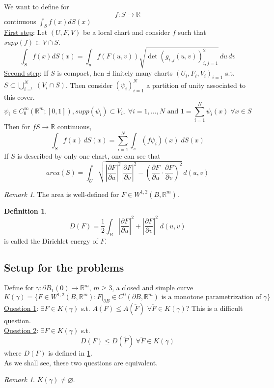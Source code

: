 \documentclass[a4paper, 12pt]{article}
\theoremstyle{plain}
\theoremstyle{definition}
\newtheorem{definition}[theorem]{Definition} %
\theoremstyle{lemma}
\theoremstyle{remark}
\newtheorem{remark}[theorem]{Remark}
\theoremstyle{corollary}
\theoremstyle{example}
\begin{document}
	We want to define for \[f: S \to \mathbb{R}\] continuous $\int_S f(x) dS(x)$\\
	\underline{First step}: Let $(U,F,V)$ be a local chart and consider $f$ such that $supp(f) \subset V \cap S$. \[\int_S f(x) dS(x) = \int_u f(F(u,v)) \sqrt{\det(g_{i,j}(u,v))^2_{i,j=1}} \, du \, dv\]
	\underline{Second step}: If $S$ is compact, hen $\exists$ finitely many charts $(U_i,F_i,V_i)_{i=1}$ s.t. $S \subset \bigcup_{i=^1}^N (V_i \cap S)$. Then consider $(\psi_i)_{i=1}^N$ a partition of unity associated to this cover. \[\psi_i \in C_0^\infty(\mathbb{R}^m; [0,1]), supp(\psi_i) \subset V_i, \; \forall i=1,...,N \text{ and } 1 = \sum_{i=1}^N \psi_i(x) \; \forall x \in S\]
	Then for $fS \to \mathbb{R}$ continuous, \[\int_S f(x) \, dS(x) = \sum_{i=1}^N \int_s (f\psi_i)(x) \; dS(x)\] If $S$ is described by only one chart, one can see that \[area(S) = \int_U \sqrt{\left|\frac{\partial F}{\partial u}\right|^2 \left|\frac{\partial F}{\partial v}\right|^2 - \left(\frac{\partial F}{\partial u} \cdot \frac{\partial F}{\partial v}\right)^2} \, d(u,v)\]
	\begin{remark}
		The area is well-defined for $F\in W^{1,2}(B,\mathbb{R}^m)$. 
	\end{remark}
	\begin{definition} \label{def: D(F)}
		\[D(F) = \frac{1}{2} \int_B \left|\frac{\partial F}{\partial u}\right|^2 + \left|\frac{\partial F}{\partial v}\right|^2 \; d(u,v)\] is called the Dirichlet energy of $F$.
	\end{definition}
	\subsection{Setup for the problems}
	Define for $\gamma: \partial B_1(0) \to \mathbb{R}^m$, $m \geq 3$, a closed and simple curve \[K(\gamma) = \{F \in W^{1,2} (B,\mathbb{R}^m): F|_{\partial B} \in C^0(\partial B, \mathbb{R}^m) \text{ is a monotone parametrization of } \gamma\}\]
	\underline{Question 1}: $\exists F \in K(\gamma)$ s.t. $A(F) \leq A(\tilde F)$ $\forall \tilde F \in K(\gamma)$? This is a difficult question.\\
	\underline{Question 2}: $\exists F \in K(\gamma)$ s.t. \[D(F) \leq D(\tilde F) \; \forall \tilde F \in K(\gamma)\] where $D(F)$ is defined in \ref{def: D(F)}.\\
	As we shall see, these two questions are equivalent.
	\begin{remark}
		$K(\gamma) \neq \varnothing$.
	\end{remark}
\end{document}
